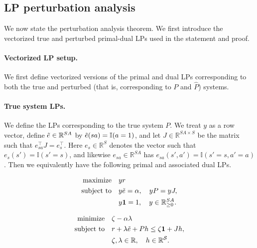 \documentclass[mnsc,nonblindrev]{informs3}
\newcommand{\R}{\mathbb{R}}
\newcommand{\Phat}{\widehat{P}}
\newcommand{\one}{\mathbf{1}}
\newcommand{\States}{\mathcal{S}}
\begin{document}
\subsection{LP perturbation analysis}
\label{subsec:thm-complete-perturbation}
We now state the perturbation analysis theorem. We first introduce the vectorized true and perturbed primal-dual LPs used in the statement and proof.

\paragraph{Vectorized LP setup.}
We first define vectorized versions of the primal and dual LPs corresponding to both the true and perturbed (that is, corresponding to $P$ and $\Phat$) systems.

\paragraph{True system LPs.}
We define the LPs corresponding to the true system $P$.
We treat $y$ as a row vector, define $\Tilde{e} \in \R^{SA}$ by $\Tilde{e}(sa) = \mathbb{I}(a = 1)$, and let $J \in \R^{SA \times S}$ be the matrix such that $e_{sa}^\top J = e_s^\top$. Here $e_s \in \R^S$ denotes the vector such that $e_s(s') = \mathbb{I}(s'=s)$, and likewise $e_{sa} \in\R^{SA}$ has $e_{sa}(s',a') = \mathbb{I}(s'=s,a'=a)$. Then we equivalently have the following primal and associated dual LPs.
\par\vspace{-0.5em}
\noindent
\begin{minipage}[t]{0.48\textwidth}
\setlength{\abovedisplayskip}{0pt}
\setlength{\abovedisplayshortskip}{0pt}
\vspace{0pt}
\vspace{-1.5em}
\begin{subequations}
\label{eq:primal_LP_true}
\begin{align}
\text{maximize} \quad
    & yr \\
\text{subject to} \quad
    & y \Tilde{e} = \alpha, \quad y P = y J, \label{eq:true_primal_arm_frac_const}\\
    &  y \one = 1,\quad y \in \R^{SA}_{\geq 0}\nonumber.
\end{align}
\end{subequations}
\end{minipage}
\hfill
\begin{minipage}[t]{0.48\textwidth}
\setlength{\abovedisplayskip}{0pt}
\setlength{\abovedisplayshortskip}{0pt}
\vspace{0pt}
\vspace{-1.5em}
\begin{subequations}
\label{eq:dual_LP_true}
\begin{align}
\text{minimize} \quad
    & \zeta - \alpha \lambda \\
\text{subject to} \quad
    & r + \lambda \Tilde{e} + P h
      \leq \zeta \one + J h, \\
    & \zeta, \lambda \in \R,\quad h \in \R^{\States}\nonumber.
\end{align}
\end{subequations}
\end{minipage}
\end{document}
